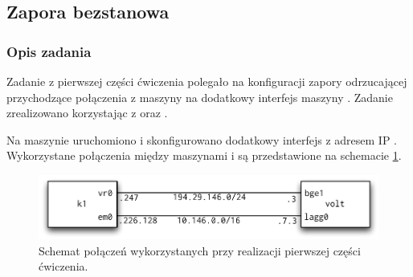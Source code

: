 \subsection{Zapora bezstanowa}
\label{sec:bezstanowe}


\subsubsection{Opis zadania}

Zadanie z pierwszej części ćwiczenia polegało na konfiguracji zapory
odrzucającej przychodzące połączenia \ssh{} z maszyny \volt{} na dodatkowy
interfejs maszyny \kdwa. Zadanie zrealizowano korzystając z \ipfw{} oraz \pf.

Na maszynie \kdwa{} uruchomiono i skonfigurowano dodatkowy interfejs \emo{} z
adresem IP \emoip. Wykorzystane połączenia między maszynami \volt{} i \kdwa{} są
przedstawione na schemacie \ref{fig:bezstanowe:polaczenia}.



\begin{figure}[h!]
  \centering
  \includegraphics[width=12cm]{figury/bezstanowe/polaczenia.pdf}
  \caption{Schemat połączeń wykorzystanych przy realizacji pierwszej części ćwiczenia.}
  \label{fig:bezstanowe:polaczenia}
\end{figure}



